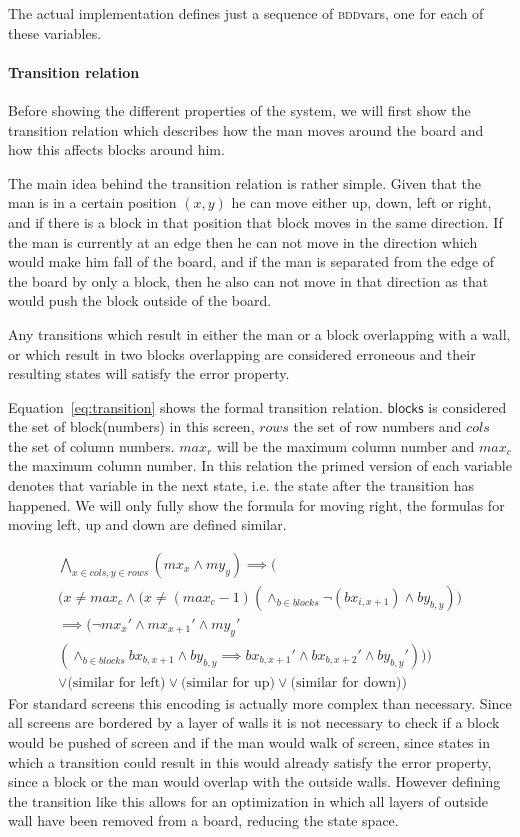 The actual implementation defines just a sequence of \textsc{bdd}vars, one for 
each of these variables. 

\paragraph{Transition relation}
Before showing the different properties of the system, we will first show the 
transition relation which describes how the man moves around the board and how
this affects blocks around him.

The main idea behind the transition relation is rather simple. Given that the 
man is in a certain position $(x,y)$ he can move either up, down, left or right,
and if there is a block in that position that block moves in the same direction.
If the man is currently at an edge then he can not move in the direction which 
would make him fall of the board, and if the man is separated from the edge of 
the board by only a block, then he also can not move in that direction as that
would push the block outside of the board.

Any transitions which result in either the man or a block overlapping with a 
wall, or which result in two blocks overlapping are considered erroneous and
their resulting states will satisfy the error property.

Equation~\ref{eq:transition} shows the formal transition relation. 
$\mathsf{blocks}$ is considered the set of block(numbers) in this screen, $rows$ 
the set of row numbers and $cols$ the set of column numbers. $max_r$ will be
the maximum column number and $max_c$ the maximum column number. In this 
relation the primed version of each variable denotes that variable in the next
state, i.e. the state after the transition has happened.
We will only 
fully show the formula for moving right, the formulas for moving left, up and
down are defined similar. 

\begin{multline}\label{eq:transition}
	\bigwedge_{x \in cols, y \in rows} (mx_x \wedge my_y) \implies \bigg(\\  
		\Big( x \neq max_c \wedge \big(x \neq (max_c-1) 
			(\wedge_{b \in blocks} \neg (bx_{i,x+1}) \wedge by_{b,y})\big)\\  
		\implies \big( \neg mx_{x}' \wedge mx_{x+1}' \wedge my_y' \\  
			(\wedge_{b \in blocks} bx_{b,x+1} \wedge by_{b,y} \implies
				bx_{b,x+1}' \wedge bx_{b,x+2}' \wedge by_{b,y}' )\big) \Big)\\  
		\vee \Big(\text{similar for left}\Big) 
			\vee \Big(\text{similar for up}\Big)
			\vee \Big(\text{similar for down}\Big) \bigg)
\end{multline}
For standard screens this encoding is actually more complex than necessary. 
Since all screens are bordered by a layer of walls it is not necessary to check
if a block would be pushed of screen and if the man would walk of screen, since
states in which a transition could result in this would already satisfy the 
error property, since a block or the man would overlap with the outside walls. 
However defining the transition like this allows for an optimization in which 
all layers of 
outside wall have been removed from a board, reducing the state space.

